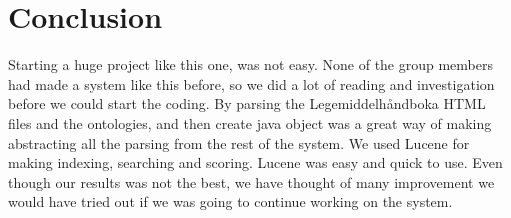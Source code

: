 \chapter{Conclusion}
\label{cha:conclusion}

Starting a huge project like this one, was not easy. None of the group members
had made a system like this before, so we did a lot of reading and investigation
before we could start the coding. By parsing the Legemiddelhåndboka HTML files
and the ontologies, and then create java object was a great way of making
abstracting all the parsing from the rest of the system. We used Lucene for
making indexing, searching and scoring. Lucene was easy and quick to use. Even
though our results was not the best, we have thought of many improvement we
would have tried out if we was going to continue working on the system.

